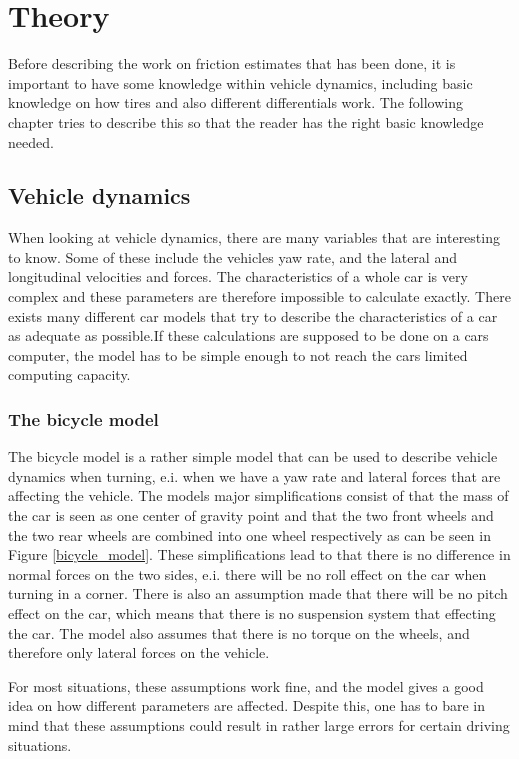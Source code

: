 \chapter{Theory}

Before describing the work on friction estimates that has been done, it is important to have some knowledge within vehicle dynamics, including basic knowledge on how tires and also different differentials work. The following chapter tries to describe this so that the reader has the right basic knowledge needed.

\section{Vehicle dynamics}

When looking at vehicle dynamics, there are many variables that are interesting to know. Some of these include the vehicles yaw rate, and the lateral and longitudinal velocities and forces. The characteristics of a whole car is very complex and these parameters are therefore impossible to calculate exactly. There exists many different car models that try to describe the characteristics of a car as adequate as possible.If these calculations are supposed to be done on a cars computer, the model has to be simple enough to not reach the cars limited computing capacity.

\subsection{The bicycle model}

The bicycle model is a rather simple model that can be used to describe vehicle dynamics when turning, e.i. when we have a yaw rate and lateral forces that are affecting the vehicle. The models major simplifications consist of that the mass of the car is seen as one center of gravity point and that the two front wheels and the two rear wheels are combined into one wheel respectively as can be seen in Figure \ref{bicycle_model}. These simplifications lead to that there is no difference in normal forces on the two sides, e.i. there will be no roll  effect on the car when turning in a corner. There is also an assumption made that there will be no pitch effect on the car, which means that there is no suspension system that effecting the car. The model also assumes that there is no torque on the wheels, and therefore only lateral forces on the vehicle.

For most situations, these assumptions work fine, and the model gives a good idea on how different parameters are affected. Despite this, one has to bare in mind that these assumptions could result in rather large errors for certain driving situations.

